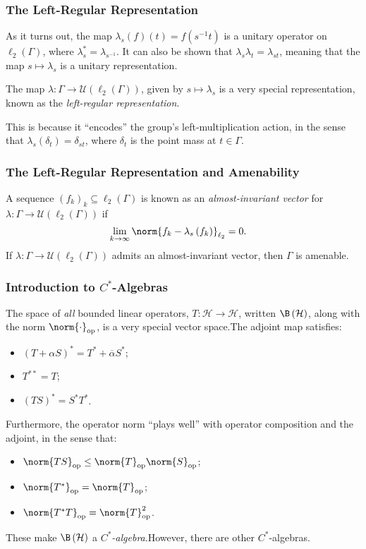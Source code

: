 \documentclass{beamer-custom}
\DeclareMathOperator{\op}{op}
\begin{document}
\begin{frame}
  \frametitle{The Left-Regular Representation}
  As it turns out, the map $\lambda_s(f)(t) = f\left( s^{-1}t \right)$ is a unitary operator on $\ell_2\left( \Gamma \right)$, where $\lambda_s^{\ast} = \lambda_{s^{-1}}$.\pause\: It can also be shown that $\lambda_s\lambda_t = \lambda_{st}$, meaning that the map $s\mapsto \lambda_s$ is a unitary representation.\pause\newline

  The map $\lambda\colon \Gamma\rightarrow \mathcal{U}\left( \ell_2\left( \Gamma \right) \right)$, given by $s\mapsto \lambda_s$ is a very special representation, known as the \textit{left-regular representation}.\pause\newline

  This is because it ``encodes'' the group's left-multiplication action, in the sense that $\lambda_s\left(\delta_t\right) = \delta_{st}$, where $\delta_t$ is the point mass at $t\in\Gamma$.
\end{frame}
\begin{frame}
  \frametitle{The Left-Regular Representation and Amenability}
  A sequence $\left( f_k \right)_k\subseteq \ell_2\left( \Gamma \right)$ is known as an \textit{almost-invariant vector} for $\lambda\colon \Gamma\rightarrow \mathcal{U}\left( \ell_2\left( \Gamma \right) \right)$ if
  \begin{align*}
    \lim_{k\rightarrow\infty}\norm{f_k - \lambda_s\left( f_k \right)}_{\ell_2} &= 0.
  \end{align*}\pause
  If $\lambda\colon \Gamma\rightarrow \mathcal{U}\left( \ell_2\left( \Gamma \right) \right)$ admits an almost-invariant vector, then $\Gamma$ is amenable.
\end{frame}
\begin{frame}
  \frametitle{Introduction to $C^{\ast}$-Algebras}
  \small
  The space of \textit{all} bounded linear operators, $T\colon \mathcal{H}\rightarrow \mathcal{H}$, written $\B\left( \mathcal{H} \right)$, along with the norm $\norm{\cdot}_{\op}$, is a very special vector space.\pause\:The adjoint map satisfies:\pause
  \begin{itemize}
    \item $\left( T + \alpha S \right)^{\ast} = T^{\ast} + \overline{\alpha} S^{\ast}$;\pause
    \item $T^{\ast\ast} = T$;\pause
    \item $\left( TS \right)^{\ast} = S^{\ast}T^{\ast}$.\pause
  \end{itemize}
  Furthermore, the operator norm ``plays well'' with operator composition and the adjoint, in the sense that:\pause
  \begin{itemize}
    \item $\norm{TS}_{\op}\leq \norm{T}_{\op}\norm{S}_{\op}$;\pause
    \item $\norm{T^{\ast}}_{\op}= \norm{T}_{\op}$;\pause
    \item $\norm{T^{\ast}T}_{\op} = \norm{T}^2_{\op}$.\pause
  \end{itemize}
  These make $\B\left( \mathcal{H} \right)$ a \textit{$C^{\ast}$-algebra}.\pause\:However, there are other $C^{\ast}$-algebras.
\end{frame}
\end{document}
